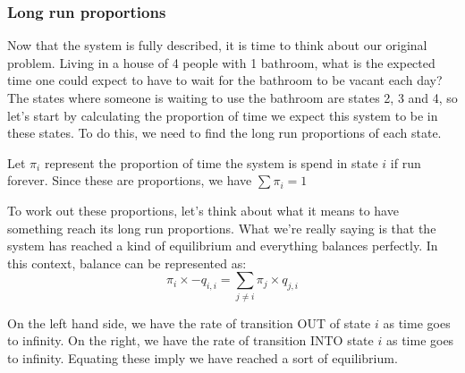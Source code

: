 \subsubsection*{Long run proportions}
Now that the system is fully described, it is time to think about our original problem. Living in a house of 4 people with 1 bathroom, what is the expected time one could expect to have to wait for the bathroom to be vacant each day? The states where someone is waiting to use the bathroom are states 2, 3 and 4, so let's start by calculating the proportion of time we expect this system to be in these states. To do this, we need to find the long run proportions of each state.

Let $\pi_i$ represent the proportion of time the system is spend in state $i$ if run forever. Since these are proportions, we have $\sum\pi_i = 1$

To work out these proportions, let's think about what it means to have something reach its long run proportions. What we're really saying is that the system has reached a kind of equilibrium and everything balances perfectly. In this context, balance can be represented as:
$$ \pi_i  \times -q_{i, i} = \sum_{j \neq i} \pi_j \times q_{j, i} $$

On the left hand side, we have the rate of transition OUT of state $ i $ as time goes to infinity. On the right, we have the rate of transition INTO state $ i $ as time goes to infinity. Equating these imply we have reached a sort of equilibrium.

